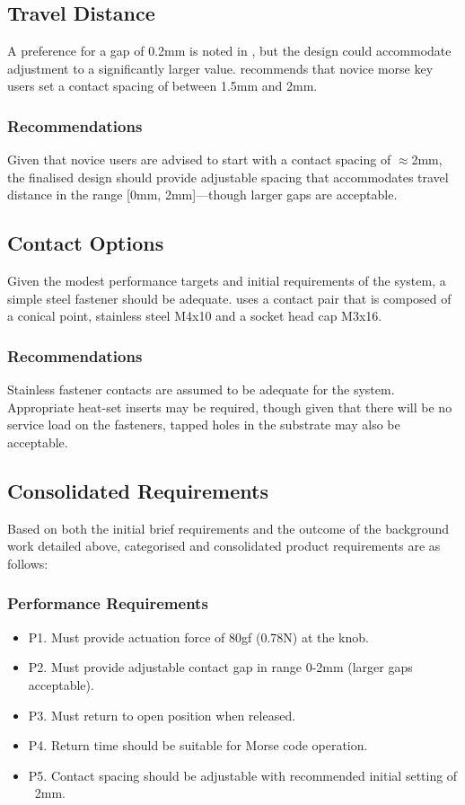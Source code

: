 \documentclass[10pt]{article}
\begin{document}
\subsection{Travel Distance}
A preference for a gap of 0.2mm is noted in \cite{giangrandi2025}, but the design could accommodate
adjustment to a significantly larger value. \cite{electronicsnotes2025} recommends that novice
morse key users set a contact spacing of between 1.5mm and 2mm.

\subsubsection{Recommendations}
Given that novice users are advised to start with a contact spacing of $\approx$2mm, the finalised
design should provide adjustable spacing that accommodates travel distance in the range [0mm,
		2mm]---though larger gaps are acceptable.

\subsection{Contact Options}
Given the modest performance targets and initial requirements of the system, a simple steel
fastener should be adequate. \cite{giangrandi2025} uses a contact pair that is composed of a
conical point, stainless steel M4x10 and a socket head cap M3x16.

\subsubsection{Recommendations}
Stainless fastener contacts are assumed to be adequate for the system. Appropriate heat-set inserts
may be required, though given that there will be no service load on the fasteners, tapped holes in
the substrate may also be acceptable.

\subsection{Consolidated Requirements}
Based on both the initial brief requirements and the outcome of the background work detailed above,
categorised and consolidated product requirements are as follows:

\subsubsection{Performance Requirements}
\begin{itemize}[leftmargin=*]
	\item P1. Must provide actuation force of 80gf (0.78N) at the knob.
	\item P2. Must provide adjustable contact gap in range 0-2mm (larger gaps acceptable).
	\item P3. Must return to open position when released.
	\item P4. Return time should be suitable for Morse code operation.
	\item P5. Contact spacing should be adjustable with recommended initial setting of ~2mm.
\end{itemize}
\end{document}
